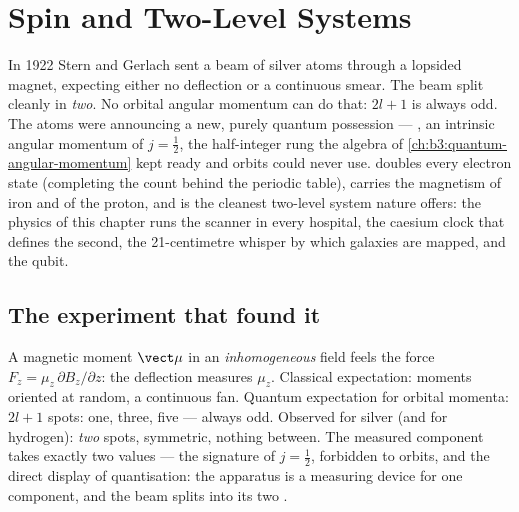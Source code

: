 \chapter{Spin and Two-Level Systems}\label{ch:b3:spin-two-level}

In 1922 Stern and Gerlach sent a beam of silver atoms through a
lopsided magnet, expecting either no deflection or a continuous
smear. The beam split cleanly in \emph{two}. No orbital angular
momentum can do that: $2l + 1$ is always odd. The atoms were
announcing a new, purely quantum possession --- \emph{}, an
intrinsic angular momentum of $j = \tfrac12$, the half-integer rung
the algebra of \cref{ch:b3:quantum-angular-momentum} kept ready and
orbits could never use.  doubles every electron state (completing
the count behind the periodic table), carries the magnetism of iron
and of the proton, and is the cleanest two-level system nature
offers: the physics of this chapter runs the 
scanner in every hospital, the caesium clock that defines the second,
the 21-centimetre whisper by which galaxies are mapped, and the qubit.

\section{The experiment that found it}

\begin{example}\label{ex:b3:spin-two-level:stern-gerlach}
A magnetic moment $\vect\mu$ in an \emph{inhomogeneous} field feels
the force $F_z = \mu_z\,\partial B_z/\partial z$: the deflection
measures $\mu_z$. Classical expectation: moments oriented at random,
a continuous fan. Quantum expectation for orbital momenta: $2l + 1$
spots: one, three, five --- always odd. Observed for silver (and
for hydrogen): \emph{two} spots, symmetric, nothing between. The
measured component takes exactly two values --- the signature of $j
= \tfrac12$, forbidden to orbits, and the direct display of
quantisation: the apparatus is a measuring device for one 
component, and the beam splits into its two .
\end{example}

